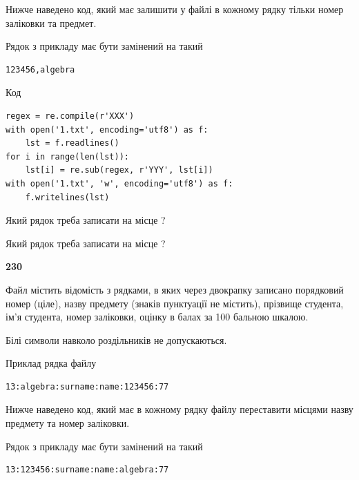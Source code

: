 Нижче наведено код, який має залишити у файлі в кожному рядку тільки номер заліковки та предмет.

Рядок з прикладу має бути замінений на такий



\begin{verbatim}
123456,algebra
\end{verbatim}




Код



\begin{verbatim}
regex = re.compile(r'XXX')
with open('1.txt', encoding='utf8') as f:
    lst = f.readlines()
for i in range(len(lst)):
    lst[i] = re.sub(regex, r'YYY', lst[i])
with open('1.txt', 'w', encoding='utf8') as f:
    f.writelines(lst)
\end{verbatim}









Який рядок треба записати на місце  ?\par
\vspace{5mm}


Який рядок треба записати на місце  ?\par


\newpage

{\begin {center}\textbf{ 230}\end {center}}\par
Файл  містить відомість з рядками, в яких через двокрапку записано поряд\-ковий номер (ціле), назву предмету (знаків пунктуації не містить), прізвище студента, ім'я студента, номер заліковки, оцінку в балах за 100 бальною шкалою.

Білі символи навколо роздільників не допускаються.

Приклад рядка файлу



\begin{verbatim}
13:algebra:surname:name:123456:77
\end{verbatim}


Нижче наведено код, який має в кожному рядку файлу переставити місцями назву предмету та номер заліковки.

Рядок з прикладу має бути замінений на такий



\begin{verbatim}
13:123456:surname:name:algebra:77
\end{verbatim}




